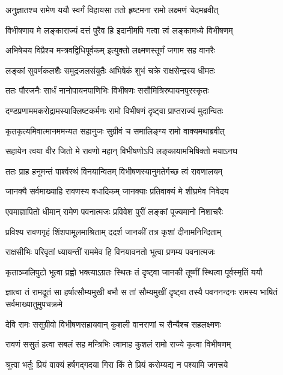 \twolineshloka
{अनुज्ञातश्च रामेण ययौ स्वर्गं विहायसा}
{ततो हृष्टमना रामो लक्ष्मणं चेदमब्रवीत्} %

\twolineshloka
{विभीषणाय मे लङ्काराज्यं दत्तं पुरैव हि}
{इदानीमपि गत्वा त्वं लङ्कामध्ये विभीषणम्} %

\twolineshloka
{अभिषेचय विप्रैश्च मन्त्रवद्विधिपूर्वकम्}
{इत्युक्तो लक्ष्मणस्तूर्णं जगाम सह वानरैः} %

\twolineshloka
{लङ्कां सुवर्णकलशैः समुद्रजलसंयुतैः}
{अभिषेकं शुभं चक्रे राक्षसेन्द्रस्य धीमतः} %

\twolineshloka
{ततः पौरजनैः सार्धं नानोपायनपाणिभिः}
{विभीषणः ससौमित्रिरुपायनपुरस्कृतः} %

\twolineshloka
{दण्डप्रणाममकरोद्रामस्याक्लिष्टकर्मणः}
{रामो विभीषणं दृष्ट्वा प्राप्तराज्यं मुदान्वितः} %

\twolineshloka
{कृतकृत्यमिवात्मानममन्यत सहानुजः}
{सुग्रीवं च समालिङ्ग्य रामो वाक्यमथाब्रवीत्} %

\twolineshloka
{सहायेन त्वया वीर जितो मे रावणो महान्}
{विभीषणोऽपि लङ्कायामभिषिक्तो मयाऽनघ} %

\twolineshloka
{ततः प्राह हनूमन्तं पार्श्वस्थं विनयान्वितम्}
{विभीषणस्यानुमतेर्गच्छ त्वं रावणालयम्} %

\twolineshloka
{जानक्यै सर्वमाख्याहि रावणस्य वधादिकम्}
{जानक्याः प्रतिवाक्यं मे शीघ्रमेव निवेदय} %

\twolineshloka
{एवमाज्ञापितो धीमान् रामेण पवनात्मजः}
{प्रविवेश पुरीं लङ्कां पूज्यमानो निशाचरैः} %

\twolineshloka
{प्रविश्य रावणगृहं शिंशपामूलमाश्रिताम्}
{ददर्श जानकीं तत्र कृशां दीनामनिन्दिताम्} %

\twolineshloka
{राक्षसीभिः परिवृतां ध्यायन्तीं राममेव हि}
{विनयावनतो भूत्वा प्रणम्य पवनात्मजः} %

\twolineshloka
{कृताञ्जलिपुटो भूत्वा प्रह्वो भक्त्याऽग्रतः स्थितः}
{तं दृष्ट्वा जानकी तूष्णीं स्थित्वा पूर्वस्मृतिं ययौ} %

\threelineshloka
{ज्ञात्वा तं रामदूतं सा हर्षात्सौम्यमुखी बभौ}
{स तां सौम्यमुखीं दृष्ट्वा तस्यै पवननन्दनः}
{रामस्य भाषितं सर्वमाख्यातुमुपचक्रमे} %

\twolineshloka
{देवि रामः ससुग्रीवो विभीषणसहायवान्}
{कुशली वानराणां च सैन्यैश्च सहलक्ष्मणः} %

\twolineshloka
{रावणं ससुतं हत्वा सबलं सह मन्त्रिभिः}
{त्वामाह कुशलं रामो राज्ये कृत्वा विभीषणम्} %

\twolineshloka
{श्रुत्वा भर्तुः प्रियं वाक्यं हर्षगद्गदया गिरा}
{किं ते प्रियं करोम्यद्य न पश्यामि जगत्त्रये} %

